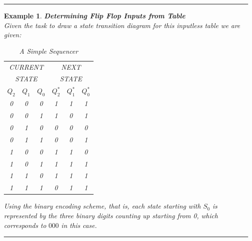 \documentclass[12pt]{article}
\newtheorem{example}{Example}
\newenvironment{examp}
{
	\vspace{.5cm}
	\hrule
\begin{example}\upshape}
	{\hrule
		\vspace{0.5cm}
\end{example}}
\begin{document}
\begin{examp}
\vspace{.5mm}
\textbf{Determining Flip Flop Inputs from Table}\\
Given the task to draw a state transition diagram for this inputless table we
are given:
\begin{table}[H]
	\centering
	\begin{tabular}{|c|c|c|c|c|c|}
		\hline
		\multicolumn{3}{|c|}{CURRENT} & \multicolumn{3}{c|}{NEXT}                                                \\
		\multicolumn{3}{|c|}{STATE}   & \multicolumn{3}{c|}{STATE}                                               \\
		\hline
		\(Q_2\)                       & \(Q_1\)                    & \(Q_0\) & \(Q_2^*\) & \(Q_1^*\) & \(Q_0^*\) \\
		\hline
		0                             & 0                          & 0       & 1         & 1         & 1         \\
		0                             & 0                          & 1       & 1         & 0         & 1         \\
		0                             & 1                          & 0       & 0         & 0         & 0         \\
		0                             & 1                          & 1       & 0         & 0         & 1         \\
		1                             & 0                          & 0       & 1         & 1         & 0         \\
		1                             & 0                          & 1       & 1         & 1         & 1         \\
		1                             & 1                          & 0       & 1         & 1         & 1         \\
		1                             & 1                          & 1       & 0         & 1         & 1         \\
		\hline
	\end{tabular}
	\caption{A Simple Sequencer}
\end{table}
Using the binary encoding scheme, that is, each state starting with \(S_0\) is
represented by the three binary digits counting up starting from 0, which
corresponds to \(000\) in this case.


\end{examp}
\end{document}
